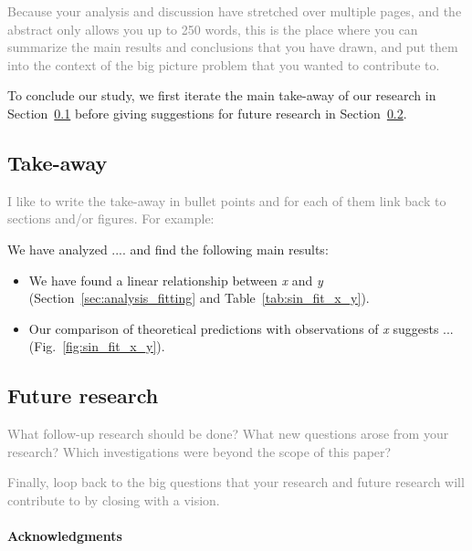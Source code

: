 \documentclass[
  journal=pasa,
  manuscript=Research-Article,
  year=2025,
  volume=X,
]{cup-journal}
\newcommand{\comment}[1]{\textcolor{gray}{#1}}
\begin{document}
\comment{Because your analysis and discussion have stretched over multiple pages, and the abstract only allows you up to 250 words, this is the place where you can summarize the main results and conclusions that you have drawn, and put them into the context of the big picture problem that you wanted to contribute to.}

To conclude our study, we first iterate the main take-away of our research in Section~\ref{sec:conclusions_takeaway} before giving suggestions for future research in Section~\ref{sec:conclusions_future_research}.

\subsection{Take-away} \label{sec:conclusions_takeaway}

\comment{I like to write the take-away in bullet points and for each of them link back to sections and/or figures. For example:}

We have analyzed .... and find the following main results:
\begin{itemize}
    \item We have found a linear relationship between \textit{x} and \textit{y} (Section~\ref{sec:analysis_fitting} and Table~\ref{tab:sin_fit_x_y}).
    \item Our comparison of theoretical predictions with observations of  \textit{x} suggests ... (Fig.~\ref{fig:sin_fit_x_y}).
\end{itemize}

\subsection{Future research} \label{sec:conclusions_future_research}

\comment{What follow-up research should be done? What new questions arose from your research? Which investigations were beyond the scope of this paper?}

\comment{Finally, loop back to the big questions that your research and future research will contribute to by closing with a vision.}

\clearpage

\paragraph{Acknowledgments}
\end{document}

